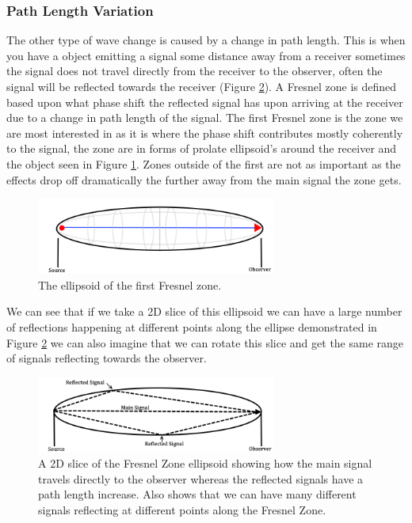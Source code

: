 \documentclass[a4paper, 10pt]{article}
\begin{document}
\subsubsection{Path Length Variation}\label{plen}
The other type of wave change is caused by a change in path length. This is when you have a object emitting a signal some distance away from a receiver sometimes the signal does not travel directly from the receiver to the observer, often the signal will be reflected towards the receiver (Figure \ref{slic}). A Fresnel zone is defined based upon what phase shift the reflected signal has upon arriving at the receiver due to a change in path length of the signal. The first Fresnel zone is the zone we are most interested in as it is where the phase shift contributes mostly coherently to the signal, the zone are in forms of prolate ellipsoid's around the receiver and the object seen in Figure \ref{elips}. Zones outside of the first are not as important as the effects drop off dramatically the further away from the main signal the zone gets.
\begin{figure}[H]
\centering 
\includegraphics[width=0.7\textwidth]{Fres_elips}
\caption{The ellipsoid of the first Fresnel zone.}
\label{elips}
\end{figure}
We can see that if we take a 2D slice of this ellipsoid we can have a large number of reflections happening at different points along the ellipse demonstrated in Figure \ref{slic} we can also imagine that we can rotate this slice and get the same range of signals reflecting towards the observer.
\begin{figure}[H]
\centering 
\includegraphics[width=0.7\textwidth]{Fres_slice}
\caption{A 2D slice of the Fresnel Zone ellipsoid showing how the main signal travels directly to the observer whereas the reflected signals have a path length increase. Also shows that we can have many different signals reflecting at different points along the Fresnel Zone.}
\label{slic}
\end{figure}
\end{document}
